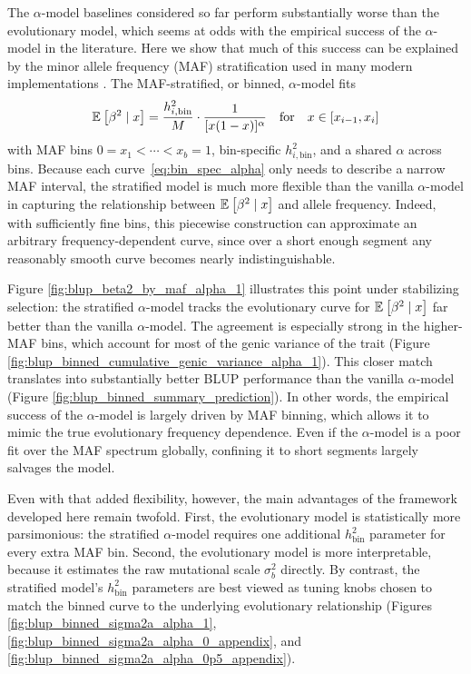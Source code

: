 \documentclass[10pt]{article}
\begin{document}
The $\alpha$-model baselines considered so far perform substantially worse than the evolutionary model,
which seems at odds with the empirical success of the $\alpha$-model in the literature.
Here we show that much of this success can be explained by the minor allele frequency (MAF) stratification used in many modern implementations \citep{Lee_2013, Yang_2015, Gazal_2017, Speed2017}.
The MAF-stratified, or binned, $\alpha$-model fits
\begin{align}
    \label{eq:bin_spec_alpha}
    \mathbb{E}_{}\left[\beta^2 \mid x\right] =
    \frac{h_{i,\mathrm{bin}}^2}{M} \cdot 
    \frac{1}{[x(1-x)]^\alpha} 
    \quad \text{for} \quad
    x \in [x_{i-1},x_i]
\end{align}
with MAF bins $0 = x_1 < \cdots < x_b =1$, bin-specific $h_{i,\mathrm{bin}}^2$, and a shared $\alpha$ across bins.
Because each curve~\eqref{eq:bin_spec_alpha} only needs to describe a narrow MAF interval, the stratified model is much more flexible than the vanilla $\alpha$-model in capturing the relationship between $\mathbb{E}_{}\left[\beta^2 \mid x\right]$ and allele frequency.
Indeed, with sufficiently fine bins, this piecewise construction can approximate an arbitrary frequency-dependent curve,
since over a short enough segment any reasonably smooth curve becomes nearly indistinguishable.

Figure \ref{fig:blup_beta2_by_maf_alpha_1} illustrates this point under stabilizing selection: the stratified $\alpha$-model tracks the evolutionary curve for $\mathbb{E}_{}\left[\beta^2 \mid x\right]$ far better than the vanilla $\alpha$-model.
The agreement is especially strong in the higher-MAF bins, which account for most of the genic variance of the trait (Figure \ref{fig:blup_binned_cumulative_genic_variance_alpha_1}).
This closer match translates into substantially better BLUP performance than the vanilla $\alpha$-model (Figure \ref{fig:blup_binned_summary_prediction}).
In other words, the empirical success of the $\alpha$-model is largely driven by MAF binning, which allows it to mimic the true evolutionary frequency dependence.
Even if the $\alpha$-model is a poor fit over the MAF spectrum globally,
confining it to short segments largely salvages the model.

Even with that added flexibility, however, the main advantages of the framework developed here remain twofold.
First, the evolutionary model is statistically more parsimonious: the stratified $\alpha$-model requires one additional $h^2_{\mathrm{bin}}$ parameter for every extra MAF bin.
Second, the evolutionary model is more interpretable, because it estimates the raw mutational scale $\sigma_b^2$ directly.
By contrast, the stratified model's $h^2_{\mathrm{bin}}$ parameters are best viewed as tuning knobs chosen to match the binned curve to the underlying evolutionary relationship (Figures \ref{fig:blup_binned_sigma2a_alpha_1}, \ref{fig:blup_binned_sigma2a_alpha_0_appendix}, 
and \ref{fig:blup_binned_sigma2a_alpha_0p5_appendix}).
\end{document}
